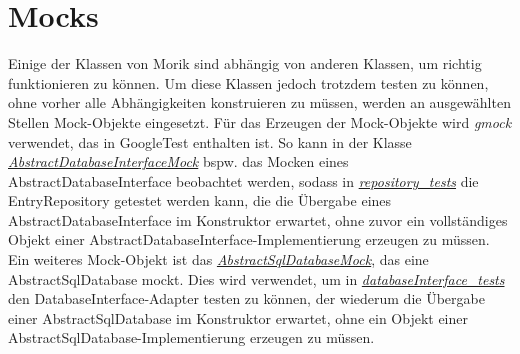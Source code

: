 \section{Mocks}
\label{sect:mocks}
Einige der Klassen von Morik sind abhängig von anderen Klassen, um richtig funktionieren zu können. Um diese Klassen jedoch trotzdem testen zu können, ohne vorher alle Abhängigkeiten konstruieren zu müssen, werden an ausgewählten Stellen Mock-Objekte eingesetzt. Für das Erzeugen der Mock-Objekte wird \textit{gmock} verwendet, das in GoogleTest enthalten ist. So kann in der Klasse \href{https://github.com/moorts/Morik/blob/main/src/tests/application/AbstractDatabaseInterfaceMock.h}{\textit{AbstractDatabaseInterfaceMock}} bspw. das Mocken eines AbstractDatabaseInterface beobachtet werden, sodass in \href{https://github.com/moorts/Morik/blob/main/src/tests/application/repository_tests.cpp}{\textit{repository\_tests}} die EntryRepository getestet werden kann, die die Übergabe eines AbstractDatabaseInterface im Konstruktor erwartet, ohne zuvor ein vollständiges Objekt einer AbstractDatabaseInterface-Implementierung erzeugen zu müssen. Ein weiteres Mock-Objekt ist das \href{https://github.com/moorts/Morik/blob/main/src/tests/adapters/database/AbstractSqlDatabaseMock.h}{\textit{AbstractSqlDatabaseMock}}, das eine AbstractSqlDatabase mockt. Dies wird verwendet, um in \href{https://github.com/moorts/Morik/blob/main/src/tests/adapters/database/databaseInterface_tests.cpp}{\textit{databaseInterface\_tests}} den DatabaseInterface-Adapter testen zu können, der wiederum die Übergabe einer AbstractSqlDatabase im Konstruktor erwartet, ohne ein Objekt einer AbstractSqlDatabase-Implementierung erzeugen zu müssen.
